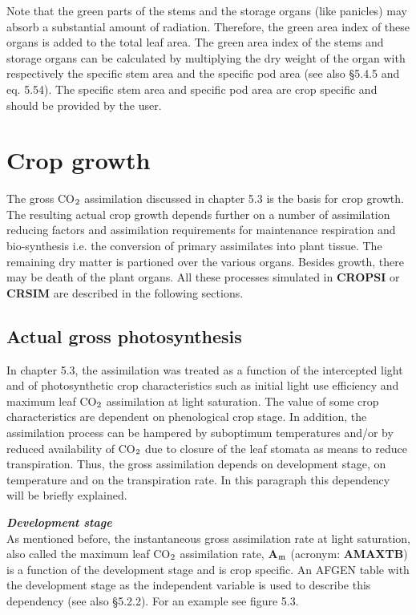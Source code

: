 Note that the green parts of the stems and the storage organs (like panicles) may absorb a
substan\-tial amount of radiation. Therefore, the green area index of these organs is added
to the total leaf area. The green area index of the stems and storage organs can be
calculated by multiplying the dry weight of the organ with respectively the specific stem
area and the specific pod area (see also \S 5.4.5 and eq. 5.54). The specific stem area and
specific pod area are crop specific and should be provided by the user.
\newpage

\section{Crop growth  }

The gross CO$_{{\rm 2}}$ assimilation discussed in chapter 5.3 is the basis for crop growth. The
resulting actual crop growth depends further on a number of assimilation reducing factors
and assimilation requirements for maintenance respiration and bio-synthesis i.e. the
conversion of primary assimilates into plant tissue. The remaining dry matter is partioned
over the various organs. Besides growth, there may be death of the plant organs. All
these processes simulated in {\bf CROPSI} or {\bf CRSIM} are described in the following sections.




\subsection{Actual gross photosynthesis  }

In chapter 5.3, the assimilation was treated as a function of the intercepted light and of
photosynthetic crop characteristics such as initial light use efficiency and maximum leaf
CO$_{{\rm 2}}$ assimilation at light saturation. The value of some crop characteristics are dependent
on phenological crop stage. In addition, the assimilation process can be hampered by
suboptimum temperatures and/or by reduced availability of CO$_{{\rm 2}}$ due to closure of the leaf
stomata as means to reduce transpiration. Thus, the gross assimila\-tion depends on
development stage, on temperature and on the transpiration rate. In this para\-graph this
dependency will be briefly explained.


{\bf {\it Development stage\/}}\\
As mentioned before, the instantaneous gross assimilation rate at light saturation, also
called the maximum leaf CO$_{{\rm 2}}$ assimilation rate, {\bf A$_{{\rm m}}$} (acronym: {\bf AMAXTB}) is a function of
the development stage and is crop specific. An AFGEN table with the development stage
as the independent variable is used to describe this dependency (see also \S 5.2.2). For an
example see figure 5.3.

